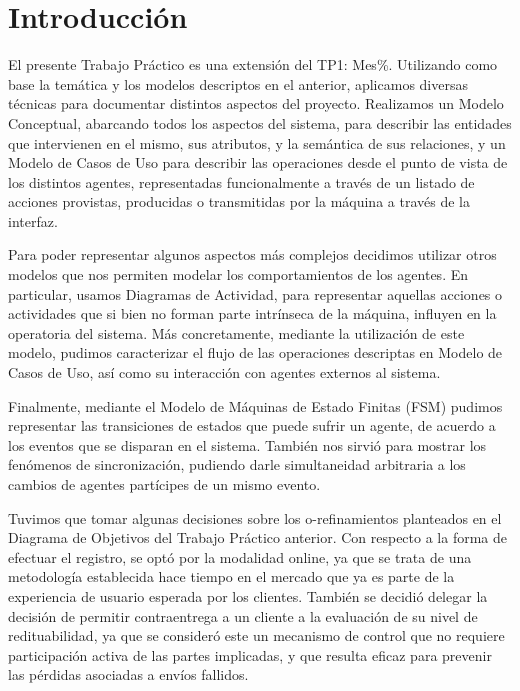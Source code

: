 
\section{Introducción}

El presente Trabajo Práctico es una extensión del TP1: Mes\%. Utilizando como base la temática y los modelos descriptos en el anterior, aplicamos diversas técnicas para documentar distintos aspectos del proyecto. Realizamos un Modelo Conceptual, abarcando todos los aspectos del sistema, para describir las entidades que intervienen en el mismo, sus atributos, y la semántica de sus relaciones, y un Modelo de Casos de Uso para describir las operaciones desde el punto de vista de los distintos agentes, representadas funcionalmente a través de un listado de acciones provistas, producidas o transmitidas por la máquina a través de la interfaz.

Para poder representar algunos aspectos más complejos decidimos utilizar otros modelos que nos permiten modelar los comportamientos de los agentes. En particular, usamos Diagramas de Actividad, para representar aquellas acciones o actividades que si bien no forman parte intrínseca de la máquina, influyen en la operatoria del sistema. Más concretamente, mediante la utilización de este modelo, pudimos caracterizar el flujo de las operaciones descriptas en Modelo de Casos de Uso, así como su interacción con agentes externos al sistema.

Finalmente, mediante el Modelo de Máquinas de Estado Finitas (FSM) pudimos representar las transiciones de estados que puede sufrir un agente, de acuerdo a los eventos que se disparan en el sistema. También nos sirvió para mostrar los fenómenos de sincronización, pudiendo darle simultaneidad arbitraria a los cambios de agentes partícipes de un mismo evento.

Tuvimos que tomar algunas decisiones sobre los o-refinamientos planteados en el Diagrama de Objetivos del Trabajo Práctico anterior. Con respecto a la forma de efectuar el registro, se optó por la modalidad online, ya que se trata de una metodología establecida hace tiempo en el mercado que ya es parte de la experiencia de usuario esperada por los clientes. También se decidió delegar la decisión de permitir contraentrega a un cliente a la evaluación de su nivel de redituabilidad, ya que se consideró este un mecanismo de control que no requiere participación activa de las partes implicadas, y que resulta eficaz para prevenir las pérdidas asociadas a envíos fallidos.
